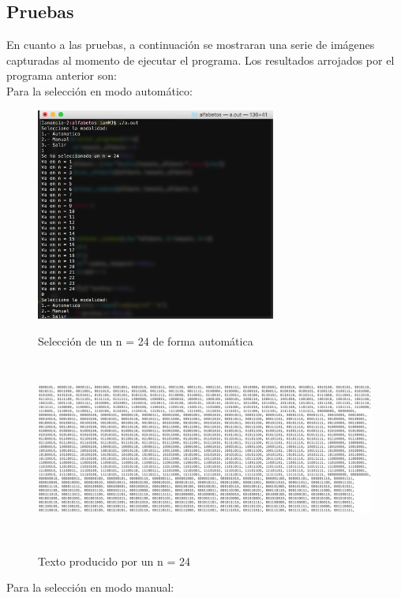 \documentclass[12pt]{article}
\begin{document}
\newpage
\subsection{Pruebas}
En cuanto a las pruebas, a continuación se mostraran una serie de imágenes capturadas al momento de ejecutar el programa. Los resultados arrojados por el programa anterior son:\\

Para la selección en modo automático:

\begin{figure}[H]
\includegraphics[width=\textwidth, height=7cm]{alfabetos_automatico}
\label{fig:auto_alfabeto}
\caption{Selección de un n = 24 de forma automática}
\end{figure}

\vspace{1em}

\begin{figure}[H]
\includegraphics[width=\textwidth, height=6cm]{alfabeto_muestra}
\label{fig:auto_alfabeto_texto}
\caption{Texto producido por un n = 24}
\end{figure}

\vspace{1em}

Para la selección en modo manual:
\end{document}
